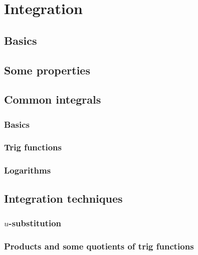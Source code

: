 \documentclass[main.tex]{subfiles}
\begin{document}
\section{Integration}
\begin{multicols}{2}
\subsection*{Basics}

\subsection*{Some properties}

\subsection*{Common integrals}
\subsubsection*{Basics}

\subsubsection*{Trig functions}

\subsubsection*{Logarithms}

\subsection*{Integration techniques}
\subsubsection*{\(u\)-substitution}

\subsubsection*{Products and some quotients of trig functions}

\end{multicols}
\end{document}
